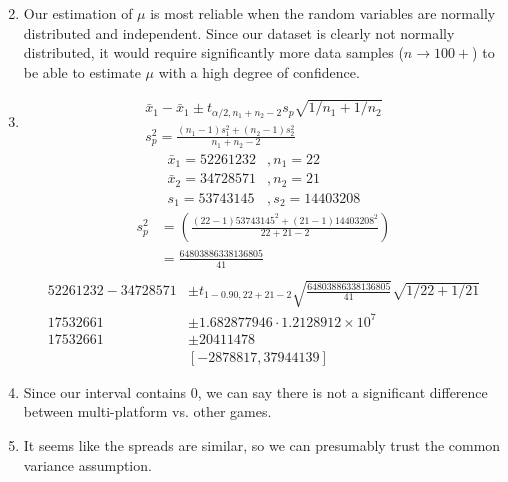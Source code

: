 \documentclass{article}
\begin{document}
\begin{enumerate}[label=(\alph*)]
\begin{multicols}{2}
          \end{multicols}
    \item Our estimation of \(\mu\) is most reliable when the random variables are normally distributed and independent. Since our dataset is clearly not normally distributed, it would require significantly more data samples (\(n \rightarrow 100+\)) to be able to estimate \(\mu\) with a high degree of confidence.
    \item \begin{align*}
              \bar{x}_1 - \bar{x}_1 \pm t_{\alpha/2,n_1+n_2-2} s_p \sqrt{1/n_1 + 1/n_2} \\
              s_p^2 = \frac{(n_1-1)s_1^2+(n_2-1)s_2^2}{n_1+n_2-2}
          \end{align*}
          \begin{align*}
              \bar{x}_1 = 52261232 & , n_1 = 22       \\
              \bar{x}_2 = 34728571 & , n_2 = 21       \\
              s_1 = 53743145       & , s_2 = 14403208
          \end{align*}
          \begin{align*}
              s_p^2 & = (\frac{(22 - 1) 53743145^2 + (21 - 1) 14403208^2}{22 + 21 - 2}) \\
                    & = \frac{64803886338136805}{41}                                    \\
          \end{align*}
          \begin{align*}
              52261232 - 34728571 & \pm t_{1-0.90, 22+21-2} \sqrt{\frac{64803886338136805}{41}} \sqrt{1/22 + 1/21} \\
              17532661            & \pm 1.682877946 \cdot 1.2128912 \times 10^7                                    \\
              17532661            & \pm 20411478                                                                   \\
                                  & [-2878817, 37944139]
          \end{align*}
    \item Since our interval contains 0, we can say there is not a significant difference between multi-platform vs. other games.
    \item It seems like the spreads are similar, so we can presumably trust the common variance assumption.
\end{enumerate}
\end{document}
